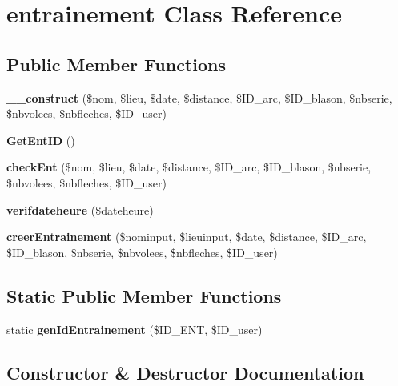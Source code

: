 \section{entrainement Class Reference}
\label{classentrainement}
\subsection*{Public Member Functions}
\begin{DoxyCompactItemize}
\item 
\textbf{ \+\_\+\+\_\+construct} (\$nom, \$lieu, \$date, \$distance, \$I\+D\+\_\+arc, \$I\+D\+\_\+blason, \$nbserie, \$nbvolees, \$nbfleches, \$I\+D\+\_\+user)
\item 
\textbf{ Get\+Ent\+ID} ()
\item 
\textbf{ check\+Ent} (\$nom, \$lieu, \$date, \$distance, \$I\+D\+\_\+arc, \$I\+D\+\_\+blason, \$nbserie, \$nbvolees, \$nbfleches, \$I\+D\+\_\+user)
\item 
\textbf{ verifdateheure} (\$dateheure)
\item 
\textbf{ creer\+Entrainement} (\$nominput, \$lieuinput, \$date, \$distance, \$I\+D\+\_\+arc, \$I\+D\+\_\+blason, \$nbserie, \$nbvolees, \$nbfleches, \$I\+D\+\_\+user)
\end{DoxyCompactItemize}
\subsection*{Static Public Member Functions}
\begin{DoxyCompactItemize}
\item 
static \textbf{ gen\+Id\+Entrainement} (\$I\+D\+\_\+\+E\+NT, \$I\+D\+\_\+user)
\end{DoxyCompactItemize}


\subsection{Constructor \& Destructor Documentation}
\mbox{\label{classentrainement_ae52b8a5c77805599d4e0ca42c306a3f7}} 
